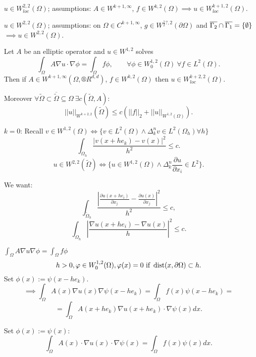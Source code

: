 \documentclass[12pt]{article}					%
\begin{document}
\begin{definice}
	$u \in W^{2, 2}_{loc}(\Omega)$; assumptions: $A \in W^{k+1, ∞}$, $f \in W^{k, 2}(\Omega) \implies u \in W_{loc}^{k + 1, 2}(\Omega)$.
\end{definice}

\begin{definice}
	$u \in W^{2, 2}(\Omega)$; assumptions: on $\Omega \in C^{k+1, ∞}$, $g \in W^{\frac{1}{2}?, 2}(\partial \Omega)$ and $\overline{\Gamma_2} \cap \overline{\Gamma_1} = \{\emptyset\}$ $\implies u \in W^{2, 2}(\Omega)$.
\end{definice}

\begin{veta}
	Let $A$ be an elliptic operator and $u \in W^{1, 2}$ solves
	$$ \int_\Omega A \nabla u · \nabla \phi = \int_\Omega f \phi, \qquad \forall \phi \in W_0^{1, 2}(\Omega)\ \forall f \in L^2(\Omega). $$
	Then if $A \in W^{k+1, ∞} (\Omega, ®R^{d, d})$, $f \in W^{k, 2}(\Omega)$ then $u \in W_{loc}^{k+2, 2}(\Omega)$.
	
	Moreover $\forall \tilde \Omega \subset \overline{\tilde \Omega} \subseteq \Omega\ \exists c(\tilde \Omega, A)$:
	$$ ||u||_{W^{k+2, 2}}(\tilde \Omega) ≤ c(||f||_2 + ||u||_{W^{1, 2}(\Omega)}). $$

	\begin{dukazin}
		$k = 0$: Recall $v \in W^{1, 2}(\Omega) \Leftrightarrow \{v \in L^2(\Omega) \land \Delta_k^n v \in L^2(\Omega_h) \forall h\}$
		$$ \int_{\Omega_h} \frac{|v(x + he_k) - v(x)|^2}{h^2} ≤ c. $$
		$$ u \in W^{2,2} (\tilde \Omega) \Leftrightarrow \{u \in W^{1, 2}(\Omega) \land \Delta_k^n \frac{\partial u}{\partial x_i} \in L^2\}. $$

		We want:
		$$ \int_{\tilde\Omega_h} \frac{\left|\frac{\partial u(x + he_i)}{\partial x_j} - \frac{\partial u(x)}{\partial x_j}\right|^2}{h^2} ≤ c, $$
		$$ \int_{\Omega_h} \left| \frac{\nabla u(x + he_i) - \nabla u(x)}{h} \right|^2 ≤ c. $$

		$\int_\Omega A \nabla u \nabla \phi = \int_\Omega f \phi$
		$$ h > 0, \varphi \in W_0^{1, 2}(\Omega), \varphi(x) = 0 \text{ if } \operatorname{dist}(x, \partial \Omega) \subset h. $$
		Set $\phi(x) := \psi(x - h e_k)$.
		$$ \implies \int_\Omega A(x) \nabla u(x) \nabla \psi(x - h e_k) = \int_\Omega f(x) \psi(x - he_k) = $$
		$$ = \int_\Omega A(x + h e_k) \nabla u(x + h e_k)·\nabla \psi(x) dx. $$

		Set $\phi(x) := \psi(x)$:
		$$ \int_\Omega A(x)·\nabla u(x) · \nabla \psi(x) = \int_\Omega f(x) \psi(x) dx. $$


\end{dukazin}
\end{veta}
\end{document}
